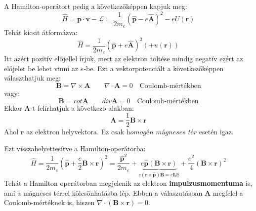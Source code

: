 \documentclass[../main.tex]{subfiles}
\begin{document}
A Hamilton-operátort pedig a következőképpen kapjuk meg:
\begin{equation}
    \hat{H} = \mathbf{p} \cdot \mathbf{v} - \mathcal{L} = \frac{1}{2m_e} \left( \hat{\mathbf{p}} - e \hat{\mathbf{A}} \right)^2 - e U(\mathbf{r})
\end{equation}
Tehát kicsit átformázva:
\begin{equation}
    \hat{H} = \frac{1}{2m_e} \left( \hat{\mathbf{p}} + e \hat{\mathbf{A}} \right)^2 \left(+ u (\mathbf{r})\right) 
\end{equation}
Itt azért pozitív előjellel írjuk, mert az elektron töltése mindig negatív ezért az előjelet be lehet vinni az $e$-be.
Ezt a vektorpotenciált a következőképpen választhatjuk meg:
\begin{equation}
    \mathbf{B} = \nabla \times \mathbf{A} \qquad \nabla \cdot \mathbf{A} = 0 \quad \text{Coulomb-mértékben}
\end{equation}
vagy:
\begin{equation}
    \mathbf{B} = rot \mathbf{A} \qquad div \mathbf{A} = 0 \quad \text{Coulomb-mértékben}
\end{equation}
Ekkor $\mathbf{A}$-t felírhatjuk a következő alakban:
\begin{equation}
    \mathbf{A} = \frac{1}{2} \mathbf{B} \times \mathbf{r}
\end{equation}
Ahol $\mathbf{r}$ az elektron helyvektora. Ez csak $\textit{homogén mágneses tér}$ esetén igaz.

Ezt visszahelyettesítve a Hamilton-operátorba:
\begin{equation}
    \hat{H} = \frac{1}{2m_e} \left( \hat{\mathbf{p}} + \frac{e}{2} \mathbf{B} \times \mathbf{r} \right)^2 = \frac{\hat{\mathbf{p}}^2}{2m_e} + \underbrace{e \hat{\mathbf{p}} \left(\mathbf{B} \times \mathbf{r}\right)}_{e(\mathbf{r} \times \hat{\mathbf{p}})\mathbf{B} = e \mathbf{L} \mathbb{B}} + \frac{e^2}{4} \left(\mathbf{B} \times \mathbf{r}\right)^2
\end{equation}
Tehát a Hamilton operátorban megjelenik az elektron \textbf{impulzusmomentuma} is, ami a mágneses térrel kölcsönhatásba lép. Ebben a válaszutásban $\mathbf{A}$ megfelel a Coulomb-mértéknek is, hiszen $\nabla \cdot (\mathbf{B} \times \mathbf{r}) = 0$.
\end{document}
